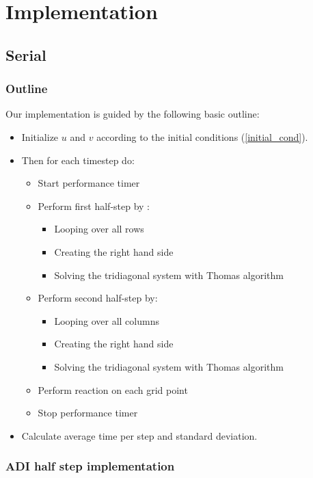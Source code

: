 \documentclass[11pt,a4paper]{article} %
\begin{document}
\section{Implementation}
\subsection{Serial}
\subsubsection{Outline}
Our implementation is guided by the following basic outline: \\
\begin{itemize}
\item Initialize $u$ and $v$ according to the initial conditions (\ref{initial_cond}).

\item Then for each timestep do:

	\begin{itemize}
	\item Start performance timer
	\item Perform first half-step by :
		\begin{itemize}
		\item Looping over all rows
		\item Creating the right hand side
		\item Solving the tridiagonal system with Thomas algorithm
		\end{itemize}
	\item Perform second half-step by:
		\begin{itemize}
		\item Looping over all columns
		\item Creating the right hand side
		\item Solving the tridiagonal system with Thomas algorithm
		\end{itemize}
	\item Perform reaction on each grid point
	\item Stop performance timer
	\end{itemize}
\item Calculate average time per step and standard deviation.  
\end{itemize}

\subsubsection{ADI half step implementation}
\end{document}
